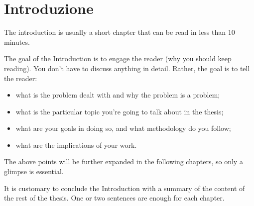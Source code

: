 
\chapter{Introduzione}

The introduction is usually a short chapter that can be read in less than 10 minutes.

The goal of the Introduction is to engage the reader (why you should keep reading).
You don't have to discuss anything in detail. Rather, the goal is to tell the reader:
\begin{itemize}
  \item what is the problem dealt with and why the problem is a problem;
  \item what is the particular topic you're going to talk about in the thesis;
  \item what are your goals in doing so, and what methodology do you follow;
  \item what are the implications of your work.
\end{itemize}

The above points will be further expanded in the following chapters, so only a glimpse is essential. 

\medskip

It is customary to conclude the Introduction with a summary of the content of the rest of the thesis. One or two sentences are enough for each chapter.